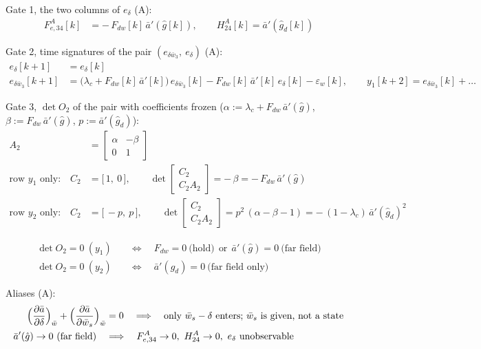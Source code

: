 \documentclass[11pt,a4paper,fontset=none]{ctexart}
\newcommand{\ba}{\bar{a}}
\newcommand{\bw}{\bar{w}}
\newcommand{\ap}{\ba'}
\newcommand{\dl}{\delta}
\newcommand{\gh}{\hat{g}}
\begin{document}
Gate 1, the two columns of $e_{\dl}$ (A):
\begin{align*}
F^{A}_{e,34}[k] &= -\,F_{dw}[k]\,\ap(\gh[k]), \qquad H^{A}_{24}[k] = \ap(\gh_d[k])
\end{align*}

Gate 2, time signatures of the pair $(e_{\delta\bw_3},\ e_{\dl})$ (A):
\begin{align*}
e_{\dl}[k+1]         &= e_{\dl}[k] \\
e_{\delta\bw_3}[k+1] &= \bigl(\lambda_c + F_{dw}[k]\,\ap[k]\bigr)\,e_{\delta\bw_3}[k] - F_{dw}[k]\,\ap[k]\,e_{\dl}[k] - \varepsilon_w[k], \qquad
y_1[k+2] = e_{\delta\bw_3}[k] + \dots
\end{align*}

Gate 3, $\det O_2$ of the pair with coefficients frozen ($\alpha := \lambda_c + F_{dw}\,\ap(\gh)$, $\beta := F_{dw}\,\ap(\gh)$, $p := \ap(\gh_d)$):
\begin{align*}
A_2 &= \begin{bmatrix} \alpha & -\beta \\ 0 & 1 \end{bmatrix} \\[4pt]
\text{row } y_1 \text{ only:}\quad C_2 &= \bigl[\,1,\ 0\,\bigr], \qquad
\det\begin{bmatrix} C_2 \\ C_2A_2 \end{bmatrix} = -\,\beta = -\,F_{dw}\,\ap(\gh) \\[4pt]
\text{row } y_2 \text{ only:}\quad C_2 &= \bigl[\,-p,\ p\,\bigr], \qquad
\det\begin{bmatrix} C_2 \\ C_2A_2 \end{bmatrix} = p^{2}\,(\alpha - \beta - 1) = -\,(1-\lambda_c)\,\ap(\gh_d)^{2}
\end{align*}

\begin{align*}
\det O_2 = 0 \ (y_1) \quad&\Longleftrightarrow\quad F_{dw} = 0 \ \text{(hold)} \ \ \text{or}\ \ \ap(\gh) = 0 \ \text{(far field)} \\
\det O_2 = 0 \ (y_2) \quad&\Longleftrightarrow\quad \ap(\gh_d) = 0 \ \text{(far field only)}
\end{align*}

Aliases (A):
\begin{align*}
\Bigl(\frac{\partial\ba}{\partial\dl}\Bigr)_{\bw} + \Bigl(\frac{\partial\ba}{\partial\bw_s}\Bigr)_{\bw} &= 0
\quad\Longrightarrow\quad \text{only } \bw_s - \dl \text{ enters; } \bw_s \text{ is given, not a state} \\
\ap(\gh) \to 0 \ \text{(far field)} \quad&\Longrightarrow\quad F^{A}_{e,34} \to 0,\ H^{A}_{24} \to 0,\ e_{\dl} \ \text{unobservable}
\end{align*}
\end{document}
